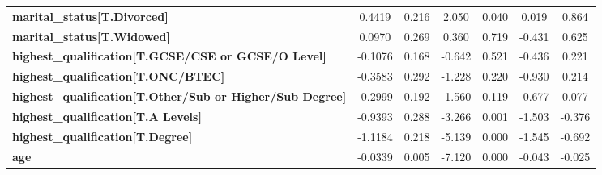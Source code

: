 \begin{center}
\begin{tabular}{lcccccc}
\textbf{marital\_status[T.Divorced]}                              &       0.4419  &        0.216     &     2.050  &         0.040        &        0.019    &        0.864     \\
\textbf{marital\_status[T.Widowed]}                               &       0.0970  &        0.269     &     0.360  &         0.719        &       -0.431    &        0.625     \\
\textbf{highest\_qualification[T.GCSE/CSE or GCSE/O Level]}       &      -0.1076  &        0.168     &    -0.642  &         0.521        &       -0.436    &        0.221     \\
\textbf{highest\_qualification[T.ONC/BTEC]}                       &      -0.3583  &        0.292     &    -1.228  &         0.220        &       -0.930    &        0.214     \\
\textbf{highest\_qualification[T.Other/Sub or Higher/Sub Degree]} &      -0.2999  &        0.192     &    -1.560  &         0.119        &       -0.677    &        0.077     \\
\textbf{highest\_qualification[T.A Levels]}                       &      -0.9393  &        0.288     &    -3.266  &         0.001        &       -1.503    &       -0.376     \\
\textbf{highest\_qualification[T.Degree]}                         &      -1.1184  &        0.218     &    -5.139  &         0.000        &       -1.545    &       -0.692     \\
\textbf{age}                                                      &      -0.0339  &        0.005     &    -7.120  &         0.000        &       -0.043    &       -0.025     \\
\bottomrule
\end{tabular}
\end{center}

